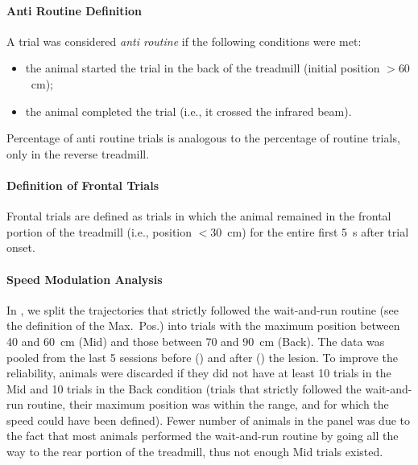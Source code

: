 \paragraph{Anti Routine Definition}
A trial was considered \emph{anti routine} if the following conditions were met:
\begin{itemize}[noitemsep]
    \item the animal started the trial in the back of the treadmill (initial position $> 60$~cm);
    \item the animal completed the trial (i.e., it crossed the infrared beam).
\end{itemize}
Percentage of anti routine trials is analogous to the percentage of routine trials, only in the reverse treadmill.


\paragraph{Definition of Frontal Trials}
Frontal trials are defined as trials in which the animal remained in the frontal portion of the treadmill (i.e., position $<30$~cm) for the entire first 5~s after trial onset.


\paragraph{Speed Modulation Analysis}
In , we split the trajectories that strictly followed the wait-and-run routine (see the definition of the Max.\ Pos.) into trials with the maximum position between 40 and 60~cm (Mid) and those between 70 and 90~cm (Back).
The data was pooled from the last 5 sessions before () and after () the lesion.
To improve the reliability, animals were discarded if they did not have at least 10 trials in the Mid and 10 trials in the Back condition (trials that strictly followed the wait-and-run routine, their maximum position was within the range, and for which the speed could have been defined).
Fewer number of animals in the  panel was due to the fact that most animals performed the wait-and-run routine by going all the way to the rear portion of the treadmill, thus not enough Mid trials existed.


